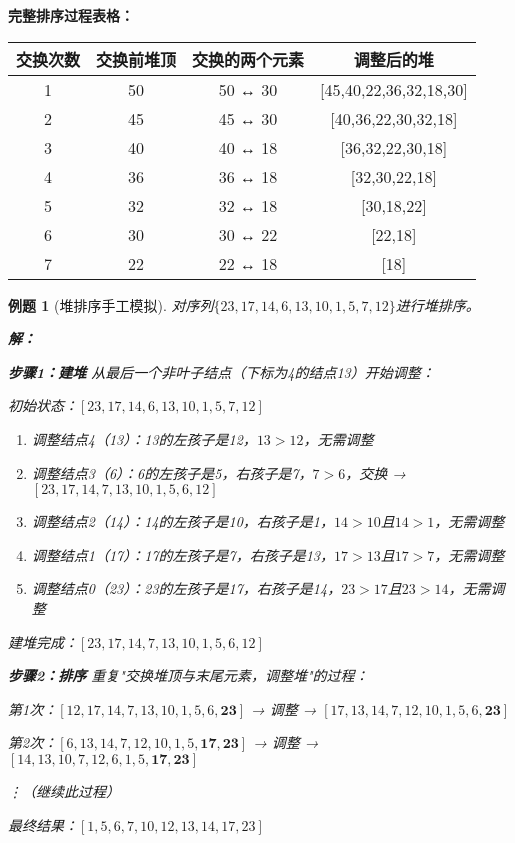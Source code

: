 \documentclass[12pt,a4paper]{amsart}
\newtheorem{example}{例题}[section]
\begin{document}
\textbf{完整排序过程表格：}

\begin{center}
\begin{tabular}{|c|c|c|c|}
\hline
\textbf{交换次数} & \textbf{交换前堆顶} & \textbf{交换的两个元素} & \textbf{调整后的堆} \\
\hline
1 & 50 & 50 ↔ 30 & [45,40,22,36,32,18,30] \\
\hline
2 & 45 & 45 ↔ 30 & [40,36,22,30,32,18] \\
\hline
3 & 40 & 40 ↔ 18 & [36,32,22,30,18] \\
\hline
4 & 36 & 36 ↔ 18 & [32,30,22,18] \\
\hline
5 & 32 & 32 ↔ 18 & [30,18,22] \\
\hline
6 & 30 & 30 ↔ 22 & [22,18] \\
\hline
7 & 22 & 22 ↔ 18 & [18] \\
\hline
\end{tabular}
\end{center}

\begin{example}[堆排序手工模拟]
对序列$\{23, 17, 14, 6, 13, 10, 1, 5, 7, 12\}$进行堆排序。

\textbf{解：}

\textbf{步骤1：建堆}
从最后一个非叶子结点（下标为4的结点13）开始调整：

初始状态：$[23, 17, 14, 6, 13, 10, 1, 5, 7, 12]$

\begin{enumerate}
\item 调整结点4（13）：13的左孩子是12，$13 > 12$，无需调整
\item 调整结点3（6）：6的左孩子是5，右孩子是7，$7 > 6$，交换 → $[23, 17, 14, 7, 13, 10, 1, 5, 6, 12]$
\item 调整结点2（14）：14的左孩子是10，右孩子是1，$14 > 10$且$14 > 1$，无需调整
\item 调整结点1（17）：17的左孩子是7，右孩子是13，$17 > 13$且$17 > 7$，无需调整
\item 调整结点0（23）：23的左孩子是17，右孩子是14，$23 > 17$且$23 > 14$，无需调整
\end{enumerate}

建堆完成：$[23, 17, 14, 7, 13, 10, 1, 5, 6, 12]$

\textbf{步骤2：排序}
重复"交换堆顶与末尾元素，调整堆"的过程：

第1次：$[12, 17, 14, 7, 13, 10, 1, 5, 6, \mathbf{23}]$ → 调整 → $[17, 13, 14, 7, 12, 10, 1, 5, 6, \mathbf{23}]$

第2次：$[6, 13, 14, 7, 12, 10, 1, 5, \mathbf{17, 23}]$ → 调整 → $[14, 13, 10, 7, 12, 6, 1, 5, \mathbf{17, 23}]$

⋮（继续此过程）

最终结果：$[1, 5, 6, 7, 10, 12, 13, 14, 17, 23]$
\end{example}
\end{document}
